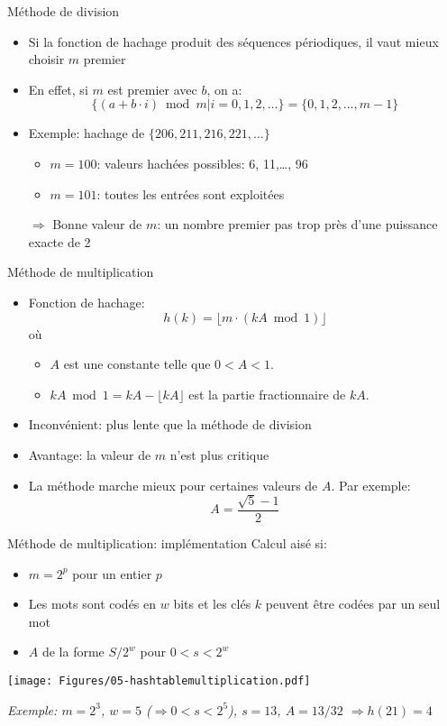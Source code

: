 \begin{frame}{Méthode de division}

\begin{itemize}
\item Si la fonction de hachage produit des séquences périodiques, il vaut mieux choisir $m$ premier
\item En effet, si $m$ est premier avec $b$, on a:
$$\{(a+b\cdot i) \bmod m|i=0,1,2,\ldots\}=\{0,1,2,\ldots,m-1\}$$
\item Exemple: hachage de $\{206, 211, 216, 221,\ldots\}$
\begin{itemize}
\item $m=100$: valeurs hachées possibles: 6, 11,\ldots, 96
\item $m=101$: toutes les entrées sont exploitées
\end{itemize}

\bigskip

\item[$\Rightarrow$] Bonne valeur de $m$: un nombre premier pas trop près d'une puissance exacte de 2
\end{itemize}
\end{frame}

\begin{frame}{Méthode de multiplication}
\begin{itemize}
\item Fonction de hachage:
$$h(k)=\lfloor m\cdot(k A \bmod 1)\rfloor$$
où
\begin{itemize}
\item $A$ est une constante telle que $0<A<1$.
\item $k A \bmod 1=k A - \lfloor k A \rfloor$ est la partie
  fractionnaire de $kA$.
\end{itemize}
\item Inconvénient: plus lente que la méthode de division
\item Avantage: la valeur de $m$ n'est plus critique
\item La méthode marche mieux pour certaines valeurs de $A$. Par
  exemple:$$A=\frac{\sqrt{5}-1}{2}$$
\end{itemize}
\end{frame}

\begin{frame}{Méthode de multiplication: implémentation}
Calcul aisé si:
\begin{itemize}
\item $m=2^p$ pour un entier $p$
\item Les mots sont codés en $w$ bits et les clés $k$ peuvent être
  codées par un seul mot
\item $A$ de la forme $S/2^w$ pour $0<s<2^w$
\end{itemize}

\centerline{\texttt{[image: Figures/05-hashtablemultiplication.pdf]}}

\bigskip

{\small\it Exemple: $m=2^3$, $w=5$ ($\Rightarrow 0<s<2^5$), $s=13$, $A=13/32$ $\Rightarrow h(21)=4$}
\end{frame}


